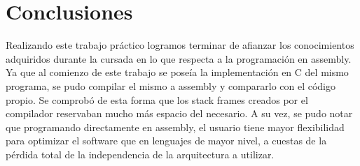 \documentclass{article}
\begin{document}
\section{Conclusiones}
Realizando este trabajo práctico logramos terminar de afianzar los conocimientos adquiridos durante la cursada en lo que respecta a la programación en assembly.
Ya que al comienzo de este trabajo se poseía la implementación en C del mismo programa, se pudo compilar el mismo a assembly y compararlo con el código propio. Se comprobó de esta forma que los stack frames creados por el compilador reservaban mucho más espacio del necesario. A su vez, se pudo notar que programando directamente en assembly, el usuario tiene mayor flexibilidad para optimizar el software que en lenguajes de mayor nivel, a cuestas de la pérdida total de la independencia de la arquitectura a utilizar. 
\end{document}

